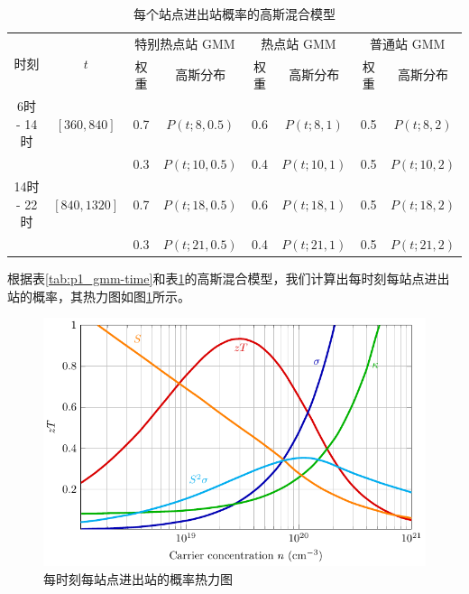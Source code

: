 \documentclass[12pt,a4paper]{mcmthesis}
\begin{document}
    \begin{table}[h]
        \centering
        \caption{每个站点进出站概率的高斯混合模型}
        \label{tab:p1_gmm-station}
        \begin{tabular}{c|c|cc|cc|cc}
            \hline
            \multirow{2}{*}{时刻} & \multirow{2}{*}{$t$} & \multicolumn{2}{c|}{特别热点站 GMM} & \multicolumn{2}{c}{热点站 GMM}
            & \multicolumn{2}{c}{普通站 GMM}
            \\ \cline{3-6}
            &                         & 权重  & 高斯分布          & 权重  & 高斯分布        & 权重  & 高斯分布        \\ \hline
            6时 - 14时  & $\left[360,840\right]$  & 0.7 & $P(t;8,0.5)$  & 0.6 & $P(t;8,1)$  & 0.5 & $P(t;8,2)$  \\
            &                         & 0.3 & $P(t;10,0.5)$ & 0.4 & $P(t;10,1)$ & 0.5 & $P(t;10,2)$ \\
            14时 - 22时 & $\left[840,1320\right]$ & 0.7 & $P(t;18,0.5)$ & 0.6 & $P(t;18,1)$ & 0.5 & $P(t;18,2)$ \\
            &                         & 0.3 & $P(t;21,0.5)$ & 0.4 & $P(t;21,1)$ & 0.5 & $P(t;21,2)$ \\ \hline
        \end{tabular}
    \end{table}

    根据表\ref{tab:p1_gmm-time}和表\ref{tab:p1_gmm-station}的高斯混合模型，我们计算出每时刻每站点进出站的概率，其热力图如图\ref{fig:p1_heatmap}所示。

    \begin{figure}[h]
        \centerline{\includegraphics[scale=0.4]{figures/fig1}\quad}
        \caption{\song\wuhao 每时刻每站点进出站的概率热力图}
        \label{fig:p1_heatmap}
    \end{figure}
\end{document}
